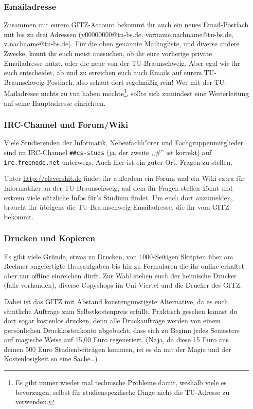 \subsubsection{Emailadresse}
\label{todomailing}
Zusammen mit eurem GITZ-Account bekommt ihr auch ein neues 
Email-Postfach mit bis zu drei Adressen (y00000000@tu-bs.de, 
vorname.nachname@tu-bs.de, v.nachname@tu-bs.de). Für die oben 
genannte Mailingliste, und diverse andere Zwecke, könnt ihr euch 
meist aussuchen, ob ihr eure vorherige private Emailadresse nutzt, 
oder die neue von der TU-Braunschweig. Aber egal wie ihr euch 
entscheidet, ab und zu erreichen euch auch Emails auf eurem 
TU-Braunschweig-Postfach, also schaut dort regelmäßig rein! Wer mit der TU-Mailadresse nichts zu tun haben möchte\footnote{Es gibt immer wieder mal technische Probleme damit, weshalb viele es bevorzugen, selbst für studienspezifische Dinge nicht die TU-Adresse zu verwenden.}, sollte sich zumindest eine Weiterleitung auf seine Hauptadresse einrichten.

\subsubsection{IRC-Channel und Forum/Wiki}

Viele Studierenden der Informatik, Nebenfachh"orer und
Fachgruppenmitglieder sind im IRC-Channel \texttt{\#\#cs-studs}
(ja, der zweite ,,\#'' ist korrekt) auf \texttt{irc.freenode.net}
unterwegs. Auch hier ist ein guter Ort, Fragen zu stellen.

Unter \url{http://clevershit.de} findet ihr außerdem ein Forum und ein 
Wiki extra für Informatiker an der TU-Braunschweig, auf dem ihr Fragen 
stellen könnt und extrem viele nützliche Infos für's Studium findet. Um 
euch dort anzumelden, braucht ihr übrigens die TU-Braunschweig-Emailadresse, 
die ihr vom GITZ bekommt.

\label{kopieren}
\subsubsection{Drucken und Kopieren}
Es gibt viele Gründe, etwas zu Drucken, von 1000-Seitigen Skripten über am Rechner angefertigte Hausaufgaben bis hin zu Formularen die ihr online erhaltet aber nur offline einreichen dürft. Zur Wahl stehen euch der heimische Drucker (falls vorhanden), diverse Copyshops im Uni-Viertel und die Drucker des GITZ.

Dabei ist das GITZ mit Abstand konstengünstigste Alternative, da es euch sämtliche Aufträge zum Selbstkostenpreis erfüllt. Praktisch gesehen kannst du dort sogar kostenlos drucken, denn alle Druckaufträge werden von einem persönlichen Druckkostenkonto abgebucht, dass sich zu Beginn jedes Semesters auf magische Weise auf 15,00 Euro regeneriert. (Naja, da diese 15 Euro aus deinen 500 Euro Studienbeiträgen kommen, ist es da mit der Magie und der Kostenlosigkeit so eine Sache\ldots)

